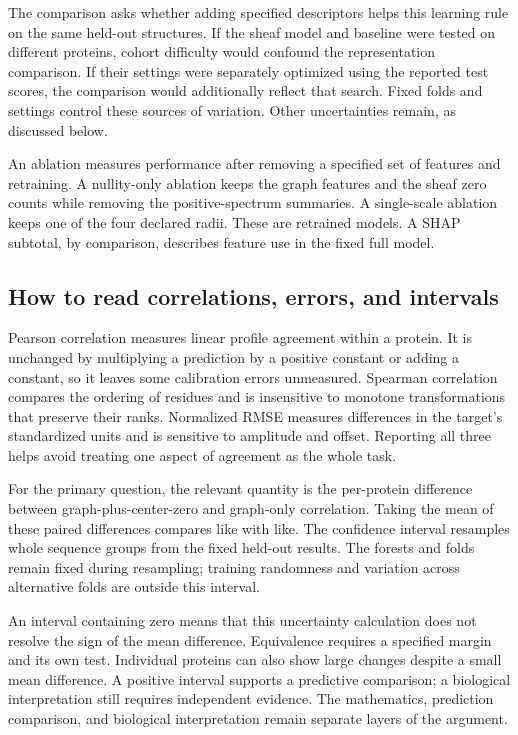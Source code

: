 The comparison asks whether adding specified descriptors helps this learning rule on the same held-out structures. If the sheaf model and baseline were tested on different proteins, cohort difficulty would confound the representation comparison. If their settings were separately optimized using the reported test scores, the comparison would additionally reflect that search. Fixed folds and settings control these sources of variation. Other uncertainties remain, as discussed below.

An ablation measures performance after removing a specified set of features and retraining. A nullity-only ablation keeps the graph features and the sheaf zero counts while removing the positive-spectrum summaries. A single-scale ablation keeps one of the four declared radii. These are retrained models. A SHAP subtotal, by comparison, describes feature use in the fixed full model.

\subsection{How to read correlations, errors, and intervals}
Pearson correlation measures linear profile agreement within a protein. It is unchanged by multiplying a prediction by a positive constant or adding a constant, so it leaves some calibration errors unmeasured. Spearman correlation compares the ordering of residues and is insensitive to monotone transformations that preserve their ranks. Normalized RMSE measures differences in the target's standardized units and is sensitive to amplitude and offset. Reporting all three helps avoid treating one aspect of agreement as the whole task.

For the primary question, the relevant quantity is the per-protein difference between graph-plus-center-zero and graph-only correlation. Taking the mean of these paired differences compares like with like. The confidence interval resamples whole sequence groups from the fixed held-out results. The forests and folds remain fixed during resampling; training randomness and variation across alternative folds are outside this interval.

An interval containing zero means that this uncertainty calculation does not resolve the sign of the mean difference. Equivalence requires a specified margin and its own test. Individual proteins can also show large changes despite a small mean difference. A positive interval supports a predictive comparison; a biological interpretation still requires independent evidence. The mathematics, prediction comparison, and biological interpretation remain separate layers of the argument.
